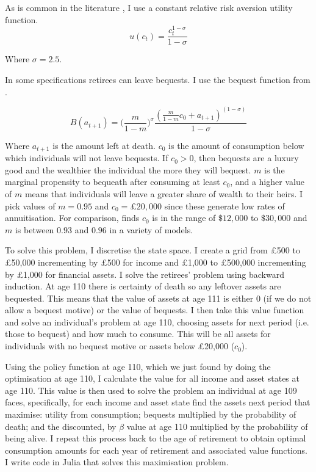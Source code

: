 \documentclass[12pt]{article}
\begin{document}
As is common in the literature \citep{lockwood_red_2012}, I use a constant relative
risk aversion utility function.
\begin{equation*}
    u(c_{t}) = \frac{c_{t}^{1 - \sigma}}{1 - \sigma}
\end{equation*}

Where $\sigma = 2.5$.

In some specifications retirees can leave bequests. I use the bequest function
from \cite{lockwood_red_2012,lockwood_aer_2018}.

\begin{equation*}
    B(a_{t+1}) = \bigl( \frac{m}{1 - m} \bigr)^{\sigma}  \frac{(\frac{m}{1 - m}c_{0} + a_{t+1})^{(1 - \sigma)}}{1 - \sigma}
\end{equation*}

Where $a_{t+1}$ is the amount left at death. $c_{0}$ is the amount of
consumption below which individuals will not leave bequests. If $c_{0} >0$, then
bequests are a luxury good and the wealthier the individual the more they will
bequest. $m$ is the marginal propensity to bequeath after consuming at least
$c_{0}$, and a higher value of $m$ means that individuals will leave a greater
share of wealth to their heirs. I pick values of $m = 0.95$ and $c_{0} = \pounds
    20,000$ since these generate low rates of annuitisation. For comparison,
\cite{lockwood_aer_2018} finds $c_{0}$ is in the range of $\$12,000$ to
$\$30,000$ and $m$ is between $0.93$ and $0.96$ in a variety of models.

To solve this problem, I discretise the state space. I create a grid from £500
to £50,000 incrementing by £500 for income and £1,000 to £500,000 incrementing
by £1,000 for financial assets. I solve the retirees' problem using backward
induction. At age 110 there is certainty of death so any leftover assets are
bequested. This means that the value of assets at age 111 is either 0 (if we do
not allow a bequest motive) or the value of bequests. I then take this value
function and solve an individual's problem at age 110, choosing assets for next
period (i.e. those to bequest) and how much to consume. This will be all assets
for individuals with no bequest motive or assets below £20,000 ($c_{0}$).

Using the policy function at age 110, which we just found by doing the
optimisation at age 110, I calculate the value for all income and asset states
at age 110. This value is then used to solve the problem an individual at age
109 faces, specifically, for each income and asset state find the assets next
period that maximise: utility from consumption; bequests multiplied by the
probability of death; and the discounted, by $\beta$ value at age 110 multiplied
by the probability of being alive. I repeat this process back to the age of
retirement to obtain optimal consumption amounts for each year of retirement and
associated value functions. I write code in Julia that solves this maximisation
problem.
\end{document}
